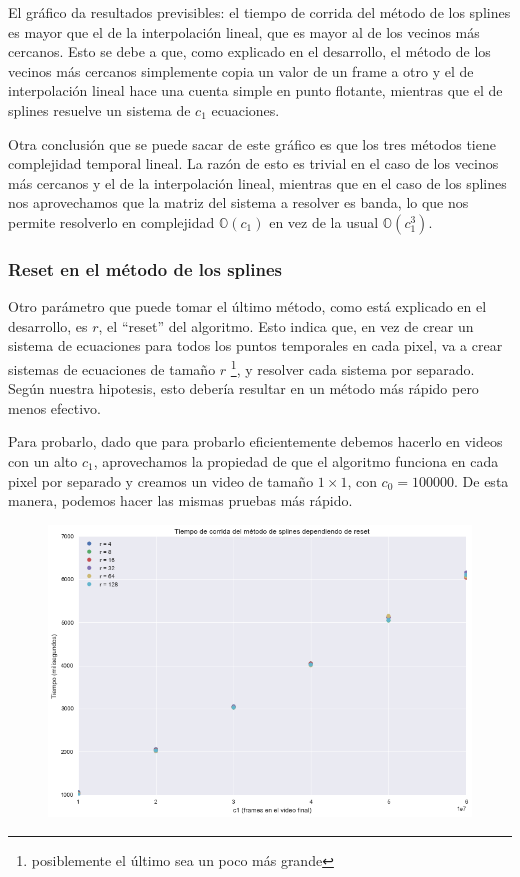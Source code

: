 El gr\'afico da resultados previsibles: el tiempo de corrida del m\'etodo de los
splines es mayor que el de la interpolaci\'on lineal, que es mayor al de los
vecinos m\'as cercanos. Esto se debe a que, como explicado en el desarrollo,
el m\'etodo de los vecinos m\'as cercanos simplemente copia un valor de un
frame a otro y el de interpolaci\'on lineal hace una cuenta simple en punto
flotante, mientras que el de splines resuelve un sistema de $c_1$ ecuaciones.

Otra conclusi\'on que se puede sacar de este gr\'afico es que los tres m\'etodos
tiene complejidad temporal lineal. La raz\'on de esto es trivial en el caso de los
vecinos m\'as cercanos y el de la interpolaci\'on lineal, mientras que en el
caso de los splines nos aprovechamos que la matriz del sistema a resolver es
banda, lo que nos permite resolverlo en complejidad $\mathbb{O}(c_1)$ en vez de
la usual $\mathbb{O}(c_1^3)$.

\subsubsection{Reset en el m\'etodo de los splines}

Otro par\'ametro que puede tomar el \'ultimo m\'etodo, como est\'a explicado en
el desarrollo, es $r$, el ``reset'' del algoritmo. Esto indica que, en vez de
crear un sistema de ecuaciones para todos los puntos temporales en cada pixel,
va a crear sistemas de ecuaciones de tama\~no $r$ \footnote{posiblemente el
\'ultimo sea un poco m\'as grande}, y resolver cada sistema por separado.
Seg\'un nuestra hipotesis, esto deber\'ia resultar en un m\'etodo m\'as r\'apido
pero menos efectivo.

Para probarlo, dado que para probarlo eficientemente debemos hacerlo en videos
con un alto $c_1$, aprovechamos la propiedad de que el algoritmo funciona en
cada pixel por separado y creamos un video de tama\~no $1 \times 1$, con $c_0 =
100000$. De esta manera, podemos hacer las mismas pruebas m\'as r\'apido.

\begin{figure}[H]
\centering
\includegraphics[width=.95\textwidth]{graficos/tiempo_reset.png}
\end{figure}

